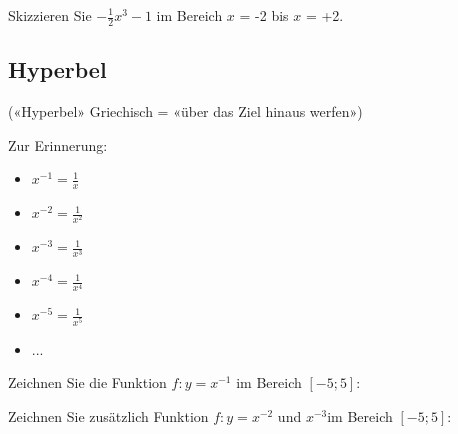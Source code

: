 Skizzieren Sie $-\frac{1}{2}x^3 - 1$ im Bereich $x$ = -2 bis $x$ = +2.

%




\newpage

\subsection{Hyperbel}
(«Hyperbel» Griechisch = «über das Ziel hinaus werfen»)


Zur Erinnerung:
\begin{multicols}{2}
\begin{itemize}
	\item $x^{-1} = \frac{1}{x}$
	\item $x^{-2} = \frac{1}{x^2}$
	\item $x^{-3} = \frac{1}{x^3}$
	\item $x^{-4} = \frac{1}{x^4}$
	\item $x^{-5} = \frac{1}{x^5}$
  \item ...
\end{itemize}
\end{multicols}

Zeichnen Sie die Funktion $f: y = x^{-1}$ im Bereich $[-5;5]$:


\newpage


Zeichnen Sie zusätzlich Funktion $f: y = x^{-2}$  und $x^{-3}$im Bereich $[-5;5]$:


